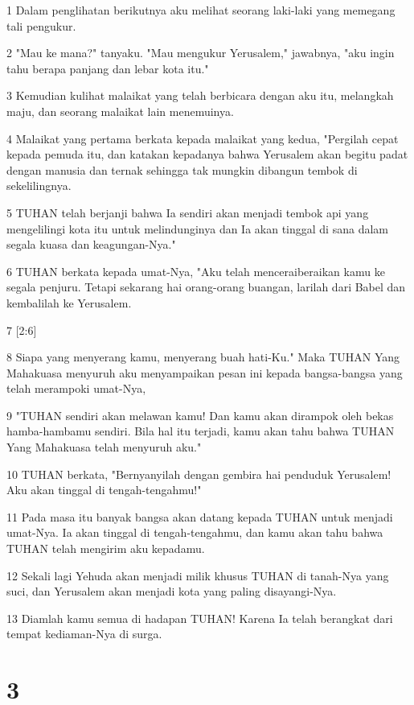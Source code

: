 \par 1 Dalam penglihatan berikutnya aku melihat seorang laki-laki yang memegang tali pengukur.
\par 2 "Mau ke mana?" tanyaku. "Mau mengukur Yerusalem," jawabnya, "aku ingin tahu berapa panjang dan lebar kota itu."
\par 3 Kemudian kulihat malaikat yang telah berbicara dengan aku itu, melangkah maju, dan seorang malaikat lain menemuinya.
\par 4 Malaikat yang pertama berkata kepada malaikat yang kedua, "Pergilah cepat kepada pemuda itu, dan katakan kepadanya bahwa Yerusalem akan begitu padat dengan manusia dan ternak sehingga tak mungkin dibangun tembok di sekelilingnya.
\par 5 TUHAN telah berjanji bahwa Ia sendiri akan menjadi tembok api yang mengelilingi kota itu untuk melindunginya dan Ia akan tinggal di sana dalam segala kuasa dan keagungan-Nya."
\par 6 TUHAN berkata kepada umat-Nya, "Aku telah menceraiberaikan kamu ke segala penjuru. Tetapi sekarang hai orang-orang buangan, larilah dari Babel dan kembalilah ke Yerusalem.
\par 7 [2:6]
\par 8 Siapa yang menyerang kamu, menyerang buah hati-Ku." Maka TUHAN Yang Mahakuasa menyuruh aku menyampaikan pesan ini kepada bangsa-bangsa yang telah merampoki umat-Nya,
\par 9 "TUHAN sendiri akan melawan kamu! Dan kamu akan dirampok oleh bekas hamba-hambamu sendiri. Bila hal itu terjadi, kamu akan tahu bahwa TUHAN Yang Mahakuasa telah menyuruh aku."
\par 10 TUHAN berkata, "Bernyanyilah dengan gembira hai penduduk Yerusalem! Aku akan tinggal di tengah-tengahmu!"
\par 11 Pada masa itu banyak bangsa akan datang kepada TUHAN untuk menjadi umat-Nya. Ia akan tinggal di tengah-tengahmu, dan kamu akan tahu bahwa TUHAN telah mengirim aku kepadamu.
\par 12 Sekali lagi Yehuda akan menjadi milik khusus TUHAN di tanah-Nya yang suci, dan Yerusalem akan menjadi kota yang paling disayangi-Nya.
\par 13 Diamlah kamu semua di hadapan TUHAN! Karena Ia telah berangkat dari tempat kediaman-Nya di surga.

\chapter{3}

